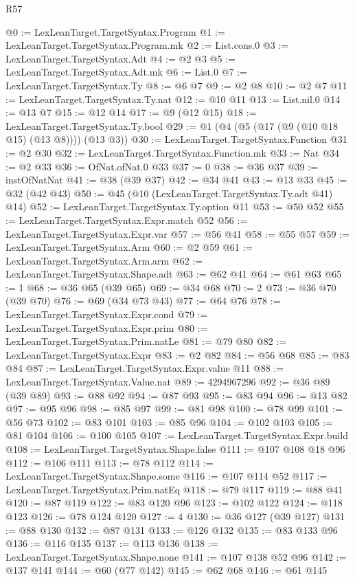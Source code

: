 \begin{lexlean}{R57}
\begin{coremodule}
@0 := LexLeanTarget.TargetSyntax.Program
@1 := LexLeanTarget.TargetSyntax.Program.mk
@2 := List.cons.{0}
@3 := LexLeanTarget.TargetSyntax.Adt
@4 := @2 @3
@5 := LexLeanTarget.TargetSyntax.Adt.mk
@6 := List.{0}
@7 := LexLeanTarget.TargetSyntax.Ty
@8 := @6 @7
@9 := @2 @8
@10 := @2 @7
@11 := LexLeanTarget.TargetSyntax.Ty.nat
@12 := @10 @11
@13 := List.nil.{0}
@14 := @13 @7
@15 := @12 @14
@17 := @9 (@12 @15)
@18 := LexLeanTarget.TargetSyntax.Ty.bool
@29 := @1 (@4 (@5 (@17 (@9 (@10 @18 @15) (@13 @8)))) (@13 @3))
@30 := LexLeanTarget.TargetSyntax.Function
@31 := @2 @30
@32 := LexLeanTarget.TargetSyntax.Function.mk
@33 := Nat
@34 := @2 @33
@36 := OfNat.ofNat.{0} @33
@37 := 0
@38 := @36 @37
@39 := instOfNatNat
@41 := @38 (@39 @37)
@42 := @34 @41
@43 := @13 @33
@45 := @32 (@42 @43)
@50 := @45 (@10 (LexLeanTarget.TargetSyntax.Ty.adt @41) @14)
@52 := LexLeanTarget.TargetSyntax.Ty.option @11
@53 := @50 @52
@55 := LexLeanTarget.TargetSyntax.Expr.match @52
@56 := LexLeanTarget.TargetSyntax.Expr.var
@57 := @56 @41
@58 := @55 @57
@59 := LexLeanTarget.TargetSyntax.Arm
@60 := @2 @59
@61 := LexLeanTarget.TargetSyntax.Arm.arm
@62 := LexLeanTarget.TargetSyntax.Shape.adt
@63 := @62 @41
@64 := @61 @63
@65 := 1
@68 := @36 @65 (@39 @65)
@69 := @34 @68
@70 := 2
@73 := @36 @70 (@39 @70)
@76 := @69 (@34 @73 @43)
@77 := @64 @76
@78 := LexLeanTarget.TargetSyntax.Expr.cond
@79 := LexLeanTarget.TargetSyntax.Expr.prim
@80 := LexLeanTarget.TargetSyntax.Prim.natLe
@81 := @79 @80
@82 := LexLeanTarget.TargetSyntax.Expr
@83 := @2 @82
@84 := @56 @68
@85 := @83 @84
@87 := LexLeanTarget.TargetSyntax.Expr.value @11
@88 := LexLeanTarget.TargetSyntax.Value.nat
@89 := 4294967296
@92 := @36 @89 (@39 @89)
@93 := @88 @92
@94 := @87 @93
@95 := @83 @94
@96 := @13 @82
@97 := @95 @96
@98 := @85 @97
@99 := @81 @98
@100 := @78 @99
@101 := @56 @73
@102 := @83 @101
@103 := @85 @96
@104 := @102 @103
@105 := @81 @104
@106 := @100 @105
@107 := LexLeanTarget.TargetSyntax.Expr.build
@108 := LexLeanTarget.TargetSyntax.Shape.false
@111 := @107 @108 @18 @96
@112 := @106 @111
@113 := @78 @112
@114 := LexLeanTarget.TargetSyntax.Shape.some
@116 := @107 @114 @52
@117 := LexLeanTarget.TargetSyntax.Prim.natEq
@118 := @79 @117
@119 := @88 @41
@120 := @87 @119
@122 := @83 @120 @96
@123 := @102 @122
@124 := @118 @123
@126 := @78 @124 @120
@127 := 4
@130 := @36 @127 (@39 @127)
@131 := @88 @130
@132 := @87 @131
@133 := @126 @132
@135 := @83 @133 @96
@136 := @116 @135
@137 := @113 @136
@138 := LexLeanTarget.TargetSyntax.Shape.none
@141 := @107 @138 @52 @96
@142 := @137 @141
@144 := @60 (@77 @142)
@145 := @62 @68
@146 := @61 @145

\end{coremodule}
\end{lexlean}
